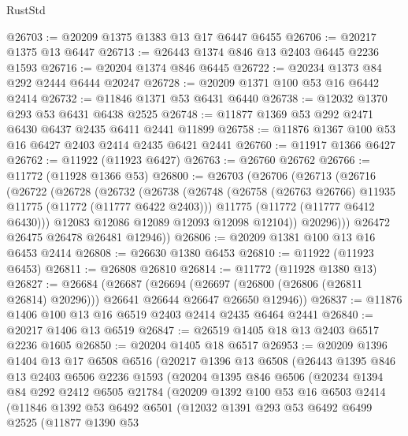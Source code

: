 \begin{lexlean}{RustStd}
\begin{coremodule}
@26703 := @20209 @1375 @1383 @13 @17 @6447 @6455
@26706 := @20217 @1375 @13 @6447
@26713 := @26443 @1374 @846 @13 @2403 @6445 @2236 @1593
@26716 := @20204 @1374 @846 @6445
@26722 := @20234 @1373 @84 @292 @2444 @6444 @20247
@26728 := @20209 @1371 @100 @53 @16 @6442 @2414
@26732 := @11846 @1371 @53 @6431 @6440
@26738 := @12032 @1370 @293 @53 @6431 @6438 @2525
@26748 := @11877 @1369 @53 @292 @2471 @6430 @6437 @2435 @6411 @2441 @11899
@26758 := @11876 @1367 @100 @53 @16 @6427 @2403 @2414 @2435 @6421 @2441
@26760 := @11917 @1366 @6427
@26762 := @11922 (@11923 @6427)
@26763 := @26760 @26762
@26766 := @11772 (@11928 @1366 @53)
@26800 := @26703
    (@26706
      (@26713
        (@26716
          (@26722
            (@26728
              (@26732
                (@26738
                  (@26748
                    (@26758 (@26763 @26766) @11935 @11775 (@11772 (@11777 @6422 @2403)))
                    @11775
                    (@11772 (@11777 @6412 @6430)))
                  @12083
                  @12086
                  @12089
                  @12093
                  @12098
                  @12104))
              @20296)))
        @26472
        @26475
        @26478
        @26481
        @12946))
@26806 := @20209 @1381 @100 @13 @16 @6453 @2414
@26808 := @26630 @1380 @6453
@26810 := @11922 (@11923 @6453)
@26811 := @26808 @26810
@26814 := @11772 (@11928 @1380 @13)
@26827 := @26684
    (@26687
      (@26694 (@26697 (@26800 (@26806 (@26811 @26814) @20296))) @26641 @26644 @26647 @26650 @12946))
@26837 := @11876 @1406 @100 @13 @16 @6519 @2403 @2414 @2435 @6464 @2441
@26840 := @20217 @1406 @13 @6519
@26847 := @26519 @1405 @18 @13 @2403 @6517 @2236 @1605
@26850 := @20204 @1405 @18 @6517
@26953 := @20209
    @1396
    @1404
    @13
    @17
    @6508
    @6516
    (@20217
      @1396
      @13
      @6508
      (@26443
        @1395
        @846
        @13
        @2403
        @6506
        @2236
        @1593
        (@20204
          @1395
          @846
          @6506
          (@20234
            @1394
            @84
            @292
            @2412
            @6505
            @21784
            (@20209
              @1392
              @100
              @53
              @16
              @6503
              @2414
              (@11846
                @1392
                @53
                @6492
                @6501
                (@12032
                  @1391
                  @293
                  @53
                  @6492
                  @6499
                  @2525
                  (@11877
                    @1390
                    @53

\end{coremodule}
\end{lexlean}
